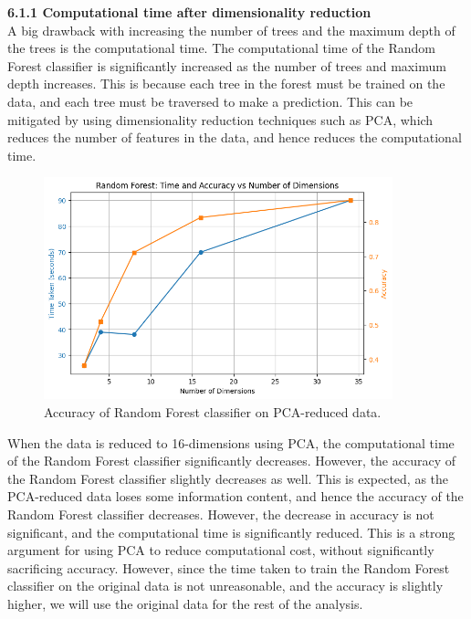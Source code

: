 \documentclass[12pt]{article}
\begin{document}
\vspace{20pt}

\textbf{6.1.1 Computational time after dimensionality reduction}
\\
A big drawback with increasing the number of trees and the maximum depth of the trees is the computational time. The computational time of the Random Forest classifier is significantly increased as the number of trees and maximum depth increases. This is because each tree in the forest must be trained on the data, and each tree must be traversed to make a prediction. This can be mitigated by using dimensionality reduction techniques such as PCA, which reduces the number of features in the data, and hence reduces the computational time.

\begin{figure}[H]
\centering
\includegraphics[width=0.9\textwidth]{figures/rf_accuracy_pca.png}
\caption{Accuracy of Random Forest classifier on PCA-reduced data.}
\label{fig:rf_accuracy_pca}
\end{figure}

When the data is reduced to 16-dimensions using PCA, the computational time of the Random Forest classifier significantly decreases. However, the accuracy of the Random Forest classifier slightly decreases as well. This is expected, as the PCA-reduced data loses some information content, and hence the accuracy of the Random Forest classifier decreases. However, the decrease in accuracy is not significant, and the computational time is significantly reduced. This is a strong argument for using PCA to reduce computational cost, without significantly sacrificing accuracy. However, since the time taken to train the Random Forest classifier on the original data is not unreasonable, and the accuracy is slightly higher, we will use the original data for the rest of the analysis.
\end{document}
